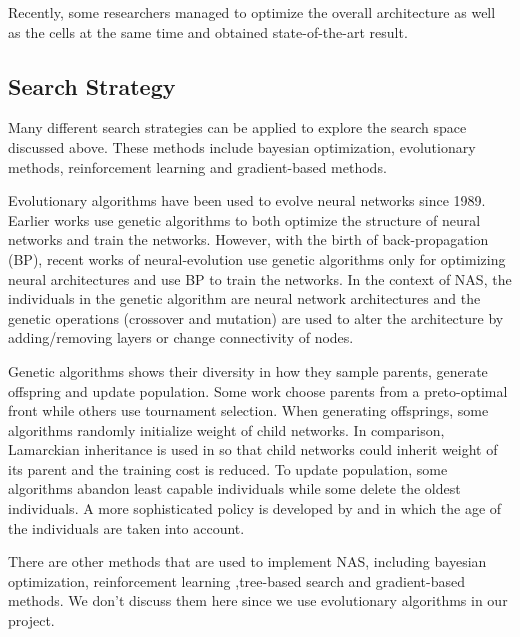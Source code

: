 \documentclass[conference]{IEEEtran}
\begin{document}
    Recently, some researchers managed to optimize the overall architecture as well as the cells at the same time and obtained state-of-the-art result\cite{liu2019auto}.
    
    \subsection{Search Strategy}
    
    Many different search strategies can be applied to explore the search space discussed above. These methods include bayesian optimization, evolutionary methods, reinforcement learning and gradient-based methods. 

    Evolutionary algorithms have been used to evolve neural networks since 1989\cite{miller1989designing}. Earlier works use genetic algorithms to both optimize the structure of neural networks and train the networks\cite{stanley2002evolving}. However, with the birth of back-propagation (BP), recent works of neural-evolution use genetic algorithms only for optimizing neural architectures and use BP to train the networks\cite{real2017large}. In the context of NAS, the individuals in the genetic algorithm are neural network architectures and the genetic operations (crossover and mutation) are used to alter the architecture by adding/removing layers or change connectivity of nodes.

    Genetic algorithms shows their diversity in how they sample parents, generate offspring and update population. Some work choose parents from a preto-optimal front\cite{elsken2018efficient} while others use tournament selection\cite{liu2018progressive}\cite{real2018regularized}\cite{real2017large}. When generating offsprings, some algorithms randomly initialize weight of child networks. In comparison, Lamarckian inheritance is used in \cite{elsken2018efficient} so that child networks could inherit weight of its parent and the training cost is reduced. To update population, some algorithms abandon least capable individuals\cite{real2017large} while some delete the oldest individuals\cite{real2018regularized}. A more sophisticated policy is developed by \cite{Hornby:2006:AAP:1143997.1144142} and \cite{DBLP:journals/corr/abs-1802-01548} in which the age of the individuals are taken into account.
    
    There are other methods that are used to implement NAS, including bayesian optimization, reinforcement learning ,tree-based search and gradient-based methods. We don't discuss them here since we use evolutionary algorithms in our project.
\end{document}
